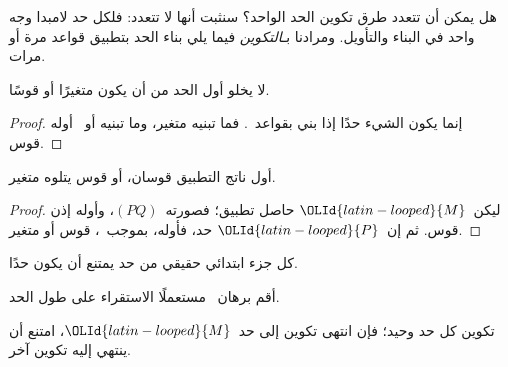 \documentclass[../../../include/open-logic-section]{subfiles}
\begin{document}

هل يمكن أن تتعدد طرق تكوين الحد الواحد؟ سنثبت أنها لا تتعدد:
فلكل حد لامبدا وجه واحد في البناء والتأويل. ومرادنا بـ\emph{التكوين}
فيما يلي بناء الحد بتطبيق قواعد  مرة أو مرات.

\begin{lem}
لا يخلو أول الحد من أن يكون متغيرًا أو قوسًا.
\end{lem}

\begin{proof}
إنما يكون الشيء حدًا إذا بني بقواعد~.
فما تبنيه  متغير، وما تبنيه
 أو~ أوله قوس.
\end{proof}

\begin{lem}
أول ناتج التطبيق قوسان، أو قوس يتلوه متغير.
\end{lem}

\begin{proof}
ليكن~${\OLId{latin-looped}{M}}$ حاصل تطبيق؛ فصورته~$(PQ)$، وأوله إذن قوس.
ثم إن~${\OLId{latin-looped}{P}}$ حد، فأوله، بموجب~، قوس أو متغير.
\end{proof}

\begin{lem}
كل جزء ابتدائي حقيقي من حد يمتنع أن يكون حدًا.
\end{lem}

\begin{prob}
أقم برهان~ مستعملًا الاستقراء على طول الحد.
\end{prob}

\begin{prop} 
تكوين كل حد وحيد؛ فإن انتهى تكوين إلى حد~${\OLId{latin-looped}{M}}$، امتنع أن ينتهي إليه تكوين آخر.
\end{prop}
\end{document}

